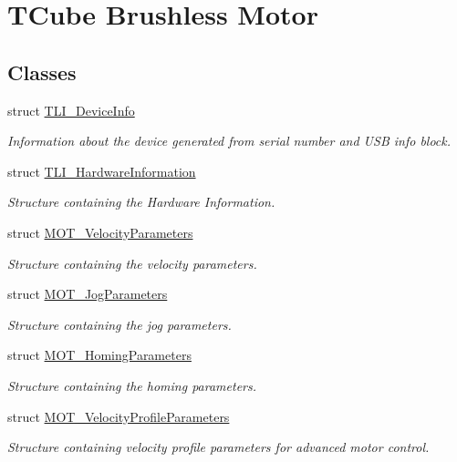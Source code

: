 \hypertarget{group___t_cube_brushless_motor}{}\section{T\+Cube Brushless Motor}
\label{group___t_cube_brushless_motor}
\subsection*{Classes}
\begin{DoxyCompactItemize}
\item 
struct \hyperlink{struct_t_l_i___device_info}{T\+L\+I\+\_\+\+Device\+Info}
\begin{DoxyCompactList}\small\item\em Information about the device generated from serial number and U\+SB info block. \end{DoxyCompactList}\item 
struct \hyperlink{struct_t_l_i___hardware_information}{T\+L\+I\+\_\+\+Hardware\+Information}
\begin{DoxyCompactList}\small\item\em Structure containing the Hardware Information. \end{DoxyCompactList}\item 
struct \hyperlink{struct_m_o_t___velocity_parameters}{M\+O\+T\+\_\+\+Velocity\+Parameters}
\begin{DoxyCompactList}\small\item\em Structure containing the velocity parameters. \end{DoxyCompactList}\item 
struct \hyperlink{struct_m_o_t___jog_parameters}{M\+O\+T\+\_\+\+Jog\+Parameters}
\begin{DoxyCompactList}\small\item\em Structure containing the jog parameters. \end{DoxyCompactList}\item 
struct \hyperlink{struct_m_o_t___homing_parameters}{M\+O\+T\+\_\+\+Homing\+Parameters}
\begin{DoxyCompactList}\small\item\em Structure containing the homing parameters. \end{DoxyCompactList}\item 
struct \hyperlink{struct_m_o_t___velocity_profile_parameters}{M\+O\+T\+\_\+\+Velocity\+Profile\+Parameters}
\begin{DoxyCompactList}\small\item\em Structure containing velocity profile parameters for advanced motor control. \end{DoxyCompactList}\item 

\end{DoxyCompactItemize}
